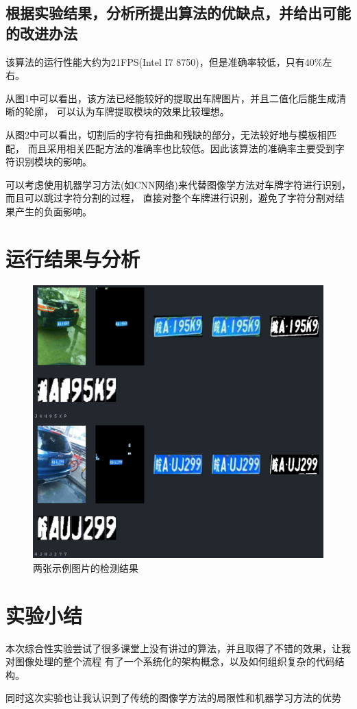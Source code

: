 \documentclass[a4paper]{ctexart}
\begin{document}
    \subsection{根据实验结果，分析所提出算法的优缺点，并给出可能的改进办法}
    该算法的运行性能大约为21FPS(Intel I7 8750)，但是准确率较低，只有40\%左右。

    从图1中可以看出，该方法已经能较好的提取出车牌图片，并且二值化后能生成清晰的轮廓，
    可以认为车牌提取模块的效果比较理想。

    从图2中可以看出，切割后的字符有扭曲和残缺的部分，无法较好地与模板相匹配，
    而且采用相关匹配方法的准确率也比较低。因此该算法的准确率主要受到字符识别模块的影响。

    可以考虑使用机器学习方法(如CNN网络)来代替图像学方法对车牌字符进行识别，而且可以跳过字符分割的过程，
    直接对整个车牌进行识别，避免了字符分割对结果产生的负面影响。


  \section{运行结果与分析}
  \begin{figure}[H]
    \includegraphics*[width=1.0\textwidth]{rep/res.png}
    \caption{两张示例图片的检测结果}
  \end{figure}

  \section{实验小结}
  本次综合性实验尝试了很多课堂上没有讲过的算法，并且取得了不错的效果，让我对图像处理的整个流程
  有了一个系统化的架构概念，以及如何组织复杂的代码结构。

  同时这次实验也让我认识到了传统的图像学方法的局限性和机器学习方法的优势
\end{document}
